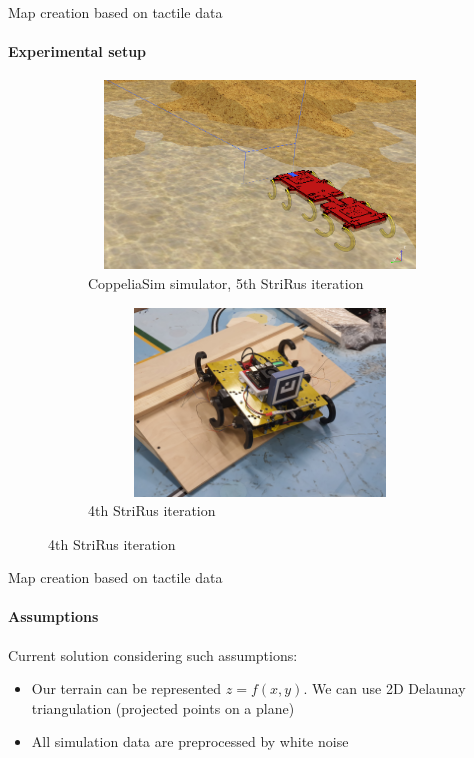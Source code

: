 \documentclass[aspectratio=169]{beamer}
\begin{document}
\begin{frame}[t]{Map creation based on tactile data}
    \framesubtitle{Experimental setup}
    \vspace{-15pt}
    \begin{figure}[H]
        \begin{subfigure}{0.49\textwidth}
            \centering\includegraphics[height=5cm,width=1\textwidth,keepaspectratio]{coppelia_sim.png}
            \caption*{CoppeliaSim simulator, 5th StriRus iteration}
        \end{subfigure}
        \begin{subfigure}{0.49\textwidth}
            \centering\includegraphics[height=5cm,width=1\textwidth,keepaspectratio]{rl_sim.JPG}
            \caption*{4th StriRus iteration}
        \end{subfigure}
    \end{figure}
\end{frame}

\begin{frame}[t]{Map creation based on tactile data}
    \framesubtitle{Assumptions}
    \Large
    Current solution considering such assumptions:
    \begin{itemize}
        \item Our terrain can be represented $z = f(x,y)$. We can use 2D Delaunay triangulation (projected points on a plane)
        \item All simulation data are preprocessed by white noise
    \end{itemize}
\end{frame}
\end{document}
